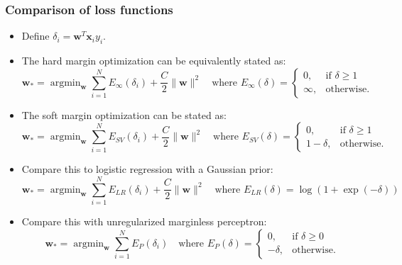 \documentclass[ignorenonframetext,plain,fleqn]{beamer}
\DeclareMathOperator*{\argmin}{argmin}
\renewcommand{\vec}{\mathbf}
\begin{document}
\begin{frame}\frametitle{Comparison of loss functions} %
\small
\begin{itemize}
\item Define $\delta_i = \vec{w}^T\vec{x}_i y_i$.
\item The hard margin optimization can be equivalently stated as: \[
  \vec{w}_* = \argmin_\vec{w} \sum_{i=1}^N E_\infty(\delta_i) + \frac{C}{2} \|\vec{w}\|^2
\quad\text{where }
E_\infty(\delta)=\begin{cases}
0,& \text{if } \delta \geq 1 \\
\infty,& \text{otherwise.}
\end{cases}
\]
\item The soft margin optimization can be stated as: \[
  \vec{w}_* = \argmin_\vec{w} \sum_{i=1}^N E_{SV}(\delta_i) + \frac{C}{2} \|\vec{w}\|^2
\quad\text{where }
E_{SV}(\delta)=\begin{cases}
0,& \text{if } \delta \geq 1 \\
1-\delta,& \text{otherwise.}
\end{cases}
\]
\item Compare this to logistic regression with a Gaussian prior: \[
  \vec{w}_* = \argmin_\vec{w} \sum_{i=1}^N E_{LR}(\delta_i) + \frac{C}{2} \|\vec{w}\|^2
\quad\text{where }
E_{LR}(\delta) = \log(1 + \exp(-\delta))
\]
\item Compare this with unregularized marginless perceptron: \[
  \vec{w}_* = \argmin_\vec{w} \sum_{i=1}^N E_P(\delta_i)
\quad\text{where }
E_{P}(\delta)=\begin{cases}
0,& \text{if } \delta \geq 0 \\
-\delta,& \text{otherwise.}
\end{cases}
\]
\end{itemize}
\end{frame}
\end{document}
